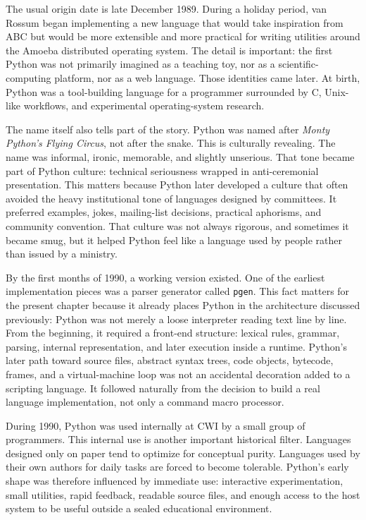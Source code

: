 The usual origin date is late December 1989. During a holiday period, van Rossum began implementing a new language that would take inspiration from ABC but would be more extensible and more practical for writing utilities around the Amoeba distributed operating system. The detail is important: the first Python was not primarily imagined as a teaching toy, nor as a scientific-computing platform, nor as a web language. Those identities came later. At birth, Python was a tool-building language for a programmer surrounded by C, Unix-like workflows, and experimental operating-system research.

The name itself also tells part of the story. Python was named after \emph{Monty Python's Flying Circus}, not after the snake. This is culturally revealing. The name was informal, ironic, memorable, and slightly unserious. That tone became part of Python culture: technical seriousness wrapped in anti-ceremonial presentation. This matters because Python later developed a culture that often avoided the heavy institutional tone of languages designed by committees. It preferred examples, jokes, mailing-list decisions, practical aphorisms, and community convention. That culture was not always rigorous, and sometimes it became smug, but it helped Python feel like a language used by people rather than issued by a ministry.

By the first months of 1990, a working version existed. One of the earliest implementation pieces was a parser generator called \texttt{pgen}. This fact matters for the present chapter because it already places Python in the architecture discussed previously: Python was not merely a loose interpreter reading text line by line. From the beginning, it required a front-end structure: lexical rules, grammar, parsing, internal representation, and later execution inside a runtime. Python's later path toward source files, abstract syntax trees, code objects, bytecode, frames, and a virtual-machine loop was not an accidental decoration added to a scripting language. It followed naturally from the decision to build a real language implementation, not only a command macro processor.

During 1990, Python was used internally at CWI by a small group of programmers. This internal use is another important historical filter. Languages designed only on paper tend to optimize for conceptual purity. Languages used by their own authors for daily tasks are forced to become tolerable. Python's early shape was therefore influenced by immediate use: interactive experimentation, small utilities, rapid feedback, readable source files, and enough access to the host system to be useful outside a sealed educational environment.

